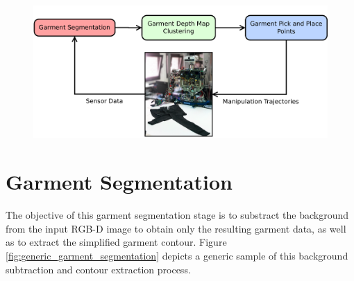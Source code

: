 \begin{figure}[thpb]
    \centering
    \includegraphics[width=\textwidth]
    {figures/Main_diagram.pdf}
    \caption{}
    \label{fig:pipeline_block_diagram}
\end{figure}

\section{Garment Segmentation}
\label{architecture:garment_segmentation}

The objective of this garment segmentation stage is to substract the background from the input RGB-D image to obtain only the resulting garment data, as well as to extract the simplified garment contour. Figure \ref{fig:generic_garment_segmentation} depicts a generic sample of this background subtraction and contour extraction process.




